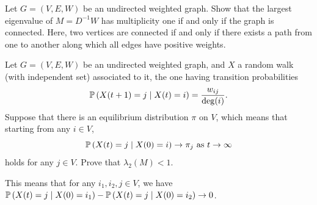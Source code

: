 \begin{myexercise}\label{prob:random_walks_connectivity}
    Let $G = (V, E, W)$ be an undirected weighted graph. Show that the largest eigenvalue of $M = D^{-1}W$ has multiplicity one if and only if the graph is connected. Here, two vertices are connected if and only if there exists a path from one to another along which all edges have positive weights.
\end{myexercise}

\begin{myexercise}\label{prob:equilibrium_distribution}
    Let $G = (V, E, W)$ be an undirected weighted graph, and $X$ a random walk (with independent set) associated to it, the one having transition probabilities
    \begin{equation*}
        \mathbb{P}\left( X(t+1) = j \mid X(t) = i \right) = \frac{w_{ij}}{\deg(i)}.
    \end{equation*}
    Suppose that there is an equilibrium distribution $\pi$ on $V$, which means that starting from any $i \in V$,
    \begin{equation*}
        \mathbb{P}\left( X(t) = j \mid X(0) = i \right) \to \pi_j \text{ as }t \to \infty
    \end{equation*}
    holds for any $j \in V$. Prove that $\lambda_2(M) < 1$.
\end{myexercise}
\begin{hint}
   This means that for any $i_1, i_2, j \in V$, we have $\mathbb{P}\left( X(t) = j \mid X(0) = i_1 \right) - \mathbb{P}\left( X(t) = j \mid X(0) = i_2 \right) \to 0$.
\end{hint}

